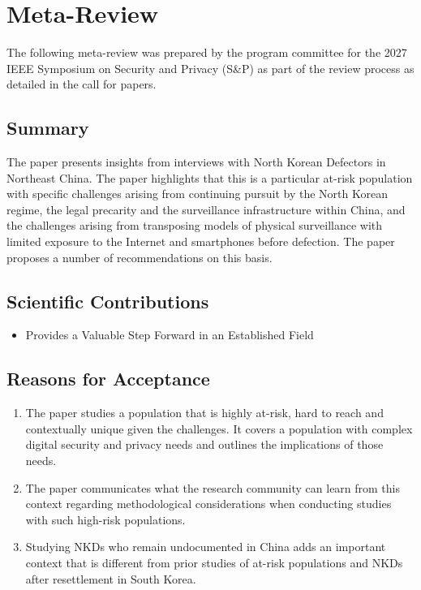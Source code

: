 \documentclass[conference,compsoc]{IEEEtran}
\begin{document}





%

\twocolumn %
\section{Meta-Review}
The following meta-review was prepared by the program committee for the 2027 IEEE Symposium on Security and Privacy (S\&P) as part of the review process as detailed in the call for papers.
\subsection{Summary}
The paper presents insights from interviews with North Korean Defectors in Northeast China. The paper highlights that this is a particular at-risk population with specific challenges arising from continuing pursuit by the North Korean regime, the legal precarity and the surveillance infrastructure within China, and the challenges arising from transposing models of physical surveillance with limited exposure to the Internet and smartphones before defection. The paper proposes a number of recommendations on this basis.
\subsection{Scientific Contributions}
\begin{itemize}
\item Provides a Valuable Step Forward in an Established Field
\end{itemize}
\subsection{Reasons for Acceptance}
\begin{enumerate}
\item The paper studies a population that is highly at-risk, hard to reach and contextually unique given the challenges. It covers a population with complex digital security and privacy needs and outlines the implications of those needs.
\item The paper communicates what the research community can learn from this context regarding methodological considerations when conducting studies with such high-risk populations.
\item Studying NKDs who remain undocumented in China adds an important context that is different from prior studies of at-risk populations and NKDs after resettlement in South Korea.
\end{enumerate}
\end{document}
